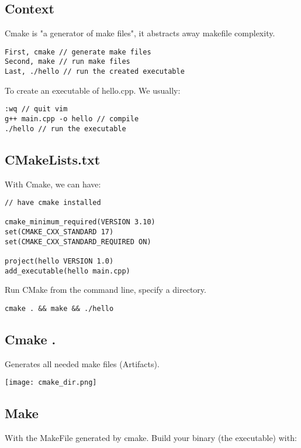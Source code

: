 \subsection{Context}

Cmake is "a generator of make files", it abstracts away makefile complexity.

\begin{verbatim}
First, cmake // generate make files
Second, make // run make files
Last, ./hello // run the created executable
\end{verbatim}

To create an executable of hello.cpp. We usually:
\begin{verbatim}
:wq // quit vim
g++ main.cpp -o hello // compile 
./hello // run the executable
\end{verbatim}

\subsection{CMakeLists.txt}

With Cmake, we can have:

\begin{verbatim}
// have cmake installed

cmake_minimum_required(VERSION 3.10)
set(CMAKE_CXX_STANDARD 17)
set(CMAKE_CXX_STANDARD_REQUIRED ON)

project(hello VERSION 1.0)
add_executable(hello main.cpp)
\end{verbatim}

Run CMake from the command line, specify a directory.
\begin{verbatim}
cmake . && make && ./hello
\end{verbatim}

\subsection{Cmake .  }

Generates all needed make files (Artifacts).

\begin{center}
    \texttt{[image: cmake\_dir.png]}
\end{center}

\subsection{Make}

With the MakeFile generated by cmake. Build your binary (the executable) with:

